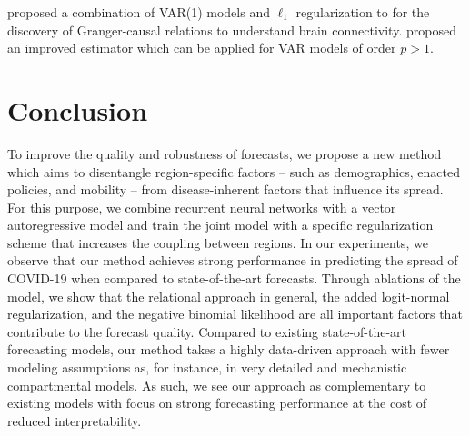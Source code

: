 \documentclass{article}
\begin{document}
\citet{valdes2005estimating} proposed a combination of VAR(1) models and \(\ell_1\)
regularization to for the discovery of Granger-causal relations to understand
brain connectivity. \citet{haufe2010sparse} proposed an improved estimator which
can be applied for VAR models of order \(p > 1\).

\section{Conclusion}
\label{sec:orgf720d80}
To improve the quality and robustness of forecasts, we propose a new method
which aims to disentangle region-specific factors -- such as demographics,
enacted policies, and mobility -- from disease-inherent factors that influence
its spread. For this purpose, we combine recurrent neural networks with a vector
autoregressive model and train the joint model with a specific regularization
scheme that increases the coupling between regions. In our experiments, we
observe that our method achieves strong performance in predicting the spread of
COVID-19 when compared to state-of-the-art forecasts. Through ablations of the
model, we show that the relational approach in general, the added logit-normal
regularization, and the negative binomial likelihood are all important factors
that contribute to the forecast quality. Compared to existing state-of-the-art
forecasting models, our method takes a highly data-driven approach with fewer
modeling assumptions as, for instance, in very detailed and mechanistic
compartmental models. As such, we see our approach as complementary to existing
models with focus on strong forecasting performance at the cost of reduced
interpretability.



\end{document}
